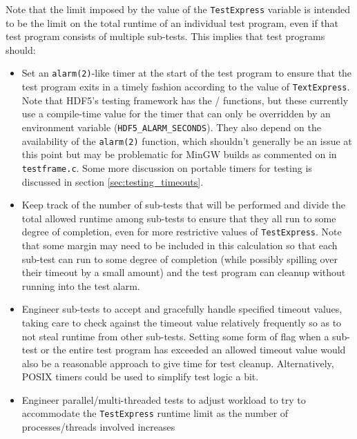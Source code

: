 \documentclass[../HDF5_RFC.tex]{subfiles}
\begin{document}
Note that the limit imposed by the value of the \texttt{TestExpress} variable is intended to be the limit
on the total runtime of an individual test program, even if that test program consists of multiple
sub-tests. This implies that test programs should:

\begin{itemize}

    \item Set an \texttt{alarm(2)}-like timer at the start of the test program to ensure that the test
          program exits in a timely fashion according to the value of \texttt{TextExpress}. Note that
          HDF5's testing framework has the  /  functions, but these currently use a compile-time value
          for the timer that can only be overridden by an environment variable
          (\texttt{HDF5\_ALARM\_SECONDS}). They also depend on the availability of the \texttt{alarm(2)} function, which shouldn't generally be an issue at this point but may be problematic for MinGW builds as commented on in \texttt{testframe.c}. Some more discussion on portable timers for
          testing is discussed in section \ref{sec:testing_timeouts}.
    \item Keep track of the number of sub-tests that will be performed and divide the total allowed
          runtime among sub-tests to ensure that they all run to some degree of completion, even for more
          restrictive values of \texttt{TestExpress}. Note that some margin may need to be included in
          this calculation so that each sub-test can run to some degree of completion (while possibly
          spilling over their timeout by a small amount) and the test program can cleanup without running
          into the test alarm.
    \item Engineer sub-tests to accept and gracefully handle specified timeout values, taking care to check
          against the timeout value relatively frequently so as to not steal runtime from other sub-tests.
          Setting some form of flag when a sub-test or the entire test program has exceeded an allowed
          timeout value would also be a reasonable approach to give time for test cleanup. Alternatively, POSIX timers could be used to simplify test logic a bit.
    \item Engineer parallel/multi-threaded tests to adjust workload to try to accommodate the
          \texttt{TestExpress} runtime limit as the number of processes/threads involved increases

\end{itemize}
\end{document}
